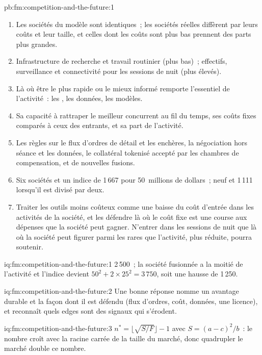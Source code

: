 \begin{solution}{pb:fm:competition-and-the-future:1}
\begin{enumerate}
\item Les sociétés du modèle sont identiques~; les sociétés réelles diffèrent par leurs coûts et leur taille, et celles dont les coûts sont plus bas prennent des parts plus grandes.
\item Infrastructure de recherche et travail routinier (plus bas)~; effectifs, surveillance et connectivité pour les sessions de nuit (plus élevés).
\item Là où être le plus rapide ou le mieux informé remporte l'essentiel de l'activité~: les , les données, les modèles.
\item Sa capacité à rattraper le meilleur concurrent au fil du temps, ses coûts fixes comparés à ceux des entrants, et sa part de l'activité.
\item Les règles sur le flux d'ordres de détail et les enchères, la négociation hors séance et les données, le collatéral tokenisé accepté par les chambres de compensation, et de nouvelles fusions.
\item Six sociétés et un indice de 1\,667 pour 50~millions de dollars~; neuf et 1\,111 lorsqu'il est divisé par deux.
\item Traiter les outils moins coûteux comme une baisse du coût d'entrée dans les activités de la société, et les défendre là où le coût fixe est une course aux dépenses que la société peut
gagner. N'entrer dans les sessions de nuit que là où la société peut figurer parmi les rares que l'activité, plus réduite, pourra soutenir.
\end{enumerate}
\end{solution}

\begin{solution}{iq:fm:competition-and-the-future:1}
2\,500~; la société fusionnée a la moitié de l'activité et l'indice devient $50^2+2\times25^2=3\,750$, soit une hausse de 1\,250.
\end{solution}

\begin{solution}{iq:fm:competition-and-the-future:2}
Une bonne réponse nomme un avantage durable et la façon dont il est défendu (flux d'ordres, coût, données, une licence), et reconnaît quels edges sont des signaux qui
s'érodent.
\end{solution}

\begin{solution}{iq:fm:competition-and-the-future:3}
$n^*=\lfloor\sqrt{S/F}\rfloor-1$ avec $S=(a-c)^2/b$~: le nombre croît avec la racine carrée de la taille du marché, donc quadrupler le marché
double ce nombre.
\end{solution}

